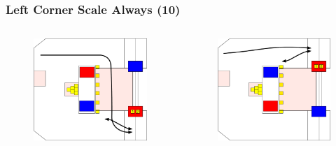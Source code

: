 \documentclass{beamer}
\begin{document}
\begin{frame}
 \frametitle{Left Corner Scale Always \alert{(10)}}
 \begin{columns}
  \begin{figure}
   \includegraphics[scale=0.15]{assets/paths/10_LR}
  \end{figure}
  \begin{figure}
   \includegraphics[scale=0.15]{assets/paths/10_RL}

\end{figure}
\end{columns}
\end{frame}
\end{document}
